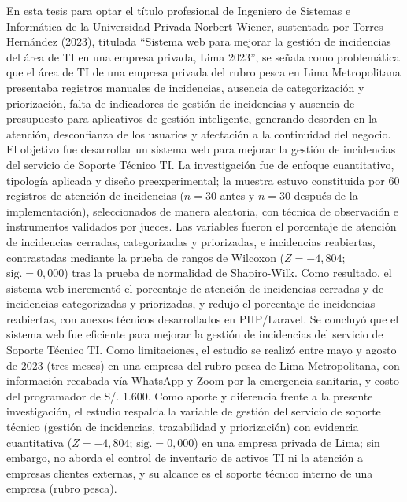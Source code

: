 En esta tesis para optar el título profesional de Ingeniero de Sistemas e Informática de la Universidad Privada Norbert Wiener, sustentada por Torres Hernández (2023), titulada ``Sistema web para mejorar la gestión de incidencias del área de TI en una empresa privada, Lima 2023'', se señala como problemática que el área de TI de una empresa privada del rubro pesca en Lima Metropolitana presentaba registros manuales de incidencias, ausencia de categorización y priorización, falta de indicadores de gestión de incidencias y ausencia de presupuesto para aplicativos de gestión inteligente, generando desorden en la atención, desconfianza de los usuarios y afectación a la continuidad del negocio. El objetivo fue desarrollar un sistema web para mejorar la gestión de incidencias del servicio de Soporte Técnico TI. La investigación fue de enfoque cuantitativo, tipología aplicada y diseño preexperimental; la muestra estuvo constituida por 60 registros de atención de incidencias ($n=30$ antes y $n=30$ después de la implementación), seleccionados de manera aleatoria, con técnica de observación e instrumentos validados por jueces. Las variables fueron el porcentaje de atención de incidencias cerradas, categorizadas y priorizadas, e incidencias reabiertas, contrastadas mediante la prueba de rangos de Wilcoxon ($Z=-4,804$; $\text{sig.}=0,000$) tras la prueba de normalidad de Shapiro-Wilk. Como resultado, el sistema web incrementó el porcentaje de atención de incidencias cerradas y de incidencias categorizadas y priorizadas, y redujo el porcentaje de incidencias reabiertas, con anexos técnicos desarrollados en PHP/Laravel. Se concluyó que el sistema web fue eficiente para mejorar la gestión de incidencias del servicio de Soporte Técnico TI. Como limitaciones, el estudio se realizó entre mayo y agosto de 2023 (tres meses) en una empresa del rubro pesca de Lima Metropolitana, con información recabada vía WhatsApp y Zoom por la emergencia sanitaria, y costo del programador de S/. 1.600. Como aporte y diferencia frente a la presente investigación, el estudio respalda la variable de gestión del servicio de soporte técnico (gestión de incidencias, trazabilidad y priorización) con evidencia cuantitativa ($Z=-4,804$; $\text{sig.}=0,000$) en una empresa privada de Lima; sin embargo, no aborda el control de inventario de activos TI ni la atención a empresas clientes externas, y su alcance es el soporte técnico interno de una empresa (rubro pesca).

\vspace{0.8em}

